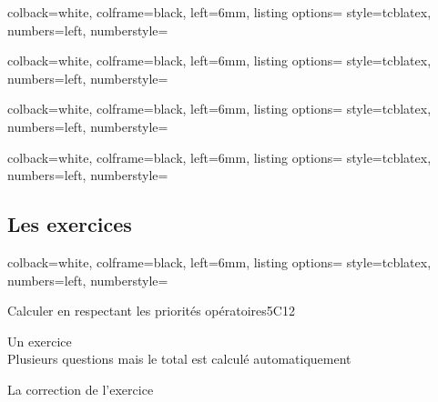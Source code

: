%
\newpage
\begin{tcblisting}{
    colback=white,
    colframe=black,
    left=6mm,
    listing options={
        style=tcblatex,
        numbers=left,
        numberstyle=\tiny\color{red!75!black}
    }
}
\begin{Remarque}[titre]

	\contenuExempleEnv

\end{Remarque}
\end{tcblisting}
%
\newpage
\begin{tcblisting}{
    colback=white,
    colframe=black,
    left=6mm,
    listing options={
        style=tcblatex,
        numbers=left,
        numberstyle=\tiny\color{red!75!black}
    }
}
\begin{Propriete}[titre]

	\contenuExempleEnv

\end{Propriete}
\end{tcblisting}
%
\newpage
\begin{tcblisting}{
    colback=white,
    colframe=black,
    left=6mm,
    listing options={
        style=tcblatex,
        numbers=left,
        numberstyle=\tiny\color{red!75!black}
    }
}
\begin{Activite}[titre]

	\contenuExempleEnv
\end{Activite}
\end{tcblisting}
%
\newpage
\begin{tcblisting}{
    colback=white,
    colframe=black,
    left=6mm,
    listing options={
        style=tcblatex,
        numbers=left,
        numberstyle=\tiny\color{red!75!black}
    }
}
\begin{Methode}[titre]

	\contenuExempleEnv

\end{Methode}
\end{tcblisting}


\subsection{Les exercices}
\begin{tcblisting}{
    colback=white,
    colframe=black,
    left=6mm,
    listing options={
        style=tcblatex,
        numbers=left,
        numberstyle=\tiny\color{red!75!black}
    }
}
\def\rdifficulty{1}
\begin{EXO}{Calculer en respectant les priorités opératoires}{5C12}


     Un exercice\\
     Plusieurs questions mais le total est calculé automatiquement
    
    
    \exocorrection
    
        
    La correction de l'exercice


\end{EXO}
\end{tcblisting}

